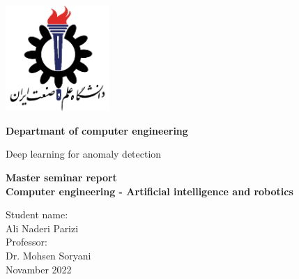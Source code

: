 \documentclass[12pt,a4paper]{report}
\begin{document}
\begin{latin}

\newpage
\thispagestyle{empty}

	\vspace*{25mm}
	\centerline{\includegraphics[height=4cm]{./images/logos/iust.png}}

	\begin{center}
	\textbf{
Departmant of computer engineering
	}
	\\[1cm]
	\baselineskip=2cm
	{\titr
	\begin{Huge}
	Deep learning for anomaly detection\\[1cm]
	\end{Huge}}
	{\Large 
		\textbf{
			Master seminar report \\
Computer engineering - Artificial intelligence and robotics
		} \\[1cm]
	}

	{\Large { Student name:}
	\\
	{\Large  Ali Naderi Parizi}
	\\[.5cm]
	{\Large  Professor:}
	\\
	{\Large Dr.  Mohsen Soryani}
	\\[.6cm]
	}
Novamber 2022
	\end{center}

\end{latin}
\end{document}
